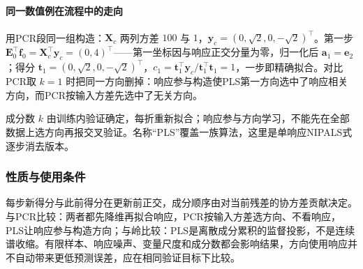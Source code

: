 \paragraph{同一数值例在流程中的走向}

用PCR段同一组构造：$\bm X_c$ 两列方差 $100$ 与 $1$，$\bm y_c=(0,\sqrt2,0,-\sqrt2)^{\top}$。第一步 $\bm E_0^{\top}\bm f_0=\bm X_c^{\top}\bm y_c=(0,4)^{\top}$——第一坐标因与响应正交分量为零，归一化后 $\bm a_1=\bm e_2$；得分 $\bm t_1=(0,\sqrt2,0,-\sqrt2)^{\top}$，$c_1=\bm t_1^{\top}\bm y_c/\bm t_1^{\top}\bm t_1=1$，一步即精确拟合。对比PCR取 $k=1$ 时把同一方向删掉：响应参与构造使PLS第一方向选中了响应相关方向，而PCR按输入方差先选中了无关方向。

成分数 $k$ 由训练内验证确定，每折重新拟合；响应参与方向学习，不能先在全部数据上选方向再报交叉验证。名称“PLS”覆盖一族算法，这里是单响应NIPALS式逐步消去版本。

\subsubsection{性质与使用条件}
\label{sec:regression-pls-theory}

每步新得分与此前得分在更新前正交，成分顺序由对当前残差的协方差贡献决定。与PCR比较：两者都先降维再拟合响应，PCR按输入方差选方向、不看响应，PLS让响应参与构造方向；与岭比较：PLS是离散成分累积的监督投影，不是连续谱收缩。有限样本、响应噪声、变量尺度和成分数都会影响结果，方向使用响应并不自动带来更低预测误差，应在相同验证目标下比较。
